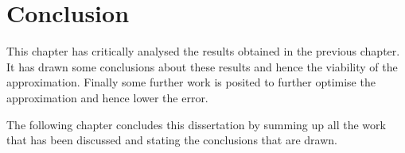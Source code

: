 
\section{Conclusion}
\label{sec:discussion_conclusion}
This chapter has critically analysed the results obtained in the previous chapter. It has drawn some conclusions about these results and hence the viability of the approximation. Finally some further work is posited to further optimise the approximation and hence lower the error.

The following chapter concludes this dissertation by summing up all the work that has been discussed and stating the conclusions that are drawn.
